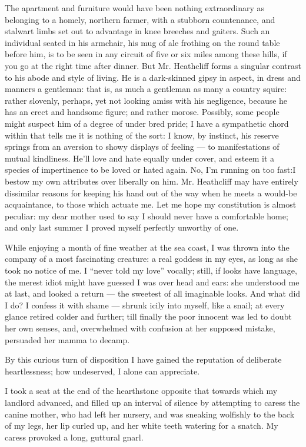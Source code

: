 \par The apartment and furniture would have been nothing extraordinary as belonging to a homely, northern farmer, with a stubborn countenance, and stalwart limbs set out to advantage in knee breeches and gaiters. Such an individual seated in his armchair, his mug of ale frothing on the round table before him, is to be seen in any circuit of five or six miles among these hills, if you go at the right time after dinner. But Mr. Heathcliff forms a singular contrast to his abode and style of living. He is a dark-skinned gipsy in aspect, in dress and manners a gentleman: that is, as much a gentleman as many a country squire: rather slovenly, perhaps, yet not looking amiss with his negligence, because he has an erect and handsome figure; and rather morose. Possibly, some people might suspect him of a degree of under bred pride; I have a sympathetic chord within that tells me it is nothing of the sort: I know, by instinct, his reserve springs from an aversion to showy displays of feeling — to manifestations of mutual kindliness. He'll love and hate equally under cover, and esteem it a species of impertinence to be loved or hated again. No, I'm running on too fast:I bestow my own attributes over liberally on him. Mr. Heathcliff may have entirely dissimilar reasons for keeping his hand out of the way when he meets a would-be acquaintance, to those which actuate me. Let me hope my constitution is almost peculiar: my dear mother used to say I should never have a comfortable home; and only last summer I proved myself perfectly unworthy of one.
\par While enjoying a month of fine weather at the sea coast, I was thrown into the company of a most fascinating creature: a real goddess in my eyes, as long as she took no notice of me. I “never told my love” vocally; still, if looks have language, the merest idiot might have guessed I was over head and ears: she understood me at last, and looked a return — the sweetest of all imaginable looks. And what did I do? I confess it with shame — shrunk icily into myself, like a snail; at every glance retired colder and further; till finally the poor innocent was led to doubt her own senses, and, overwhelmed with confusion at her supposed mistake, persuaded her mamma to decamp.
\par By this curious turn of disposition I have gained the reputation of deliberate heartlessness; how undeserved, I alone can appreciate.
\par I took a seat at the end of the hearthstone opposite that towards which my landlord advanced, and filled up an interval of silence by attempting to caress the canine mother, who had left her nursery, and was sneaking wolfishly to the back of my legs, her lip curled up, and her white teeth watering for a snatch. My caress provoked a long, guttural gnarl.
